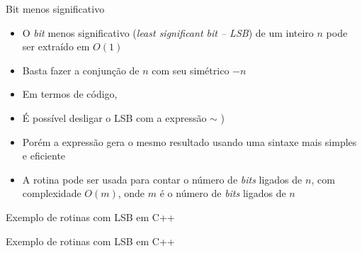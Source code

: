 \begin{frame}[fragile]{Bit menos significativo}

    \begin{itemize}
        \item O \textit{bit} menos significativo (\textit{least significant bit -- LSB}) de um 
            inteiro $n$ pode ser extraído em $O(1)$

        \item Basta fazer a conjunção de $n$ com seu simétrico $-n$

        \item Em termos de código, 

        \item É possível desligar o LSB com a expressão  $\sim$ )

        \item Porém a expressão  gera o mesmo resultado usando uma
            sintaxe mais simples e eficiente

        \item A rotina  pode ser usada para contar o número de \textit{bits} 
            ligados de $n$, com complexidade $O(m)$, onde $m$ é o número de \textit{bits} ligados
            de $n$

    \end{itemize}

\end{frame}

\begin{frame}[fragile]{Exemplo de rotinas com LSB em C++}
\end{frame}

\begin{frame}[fragile]{Exemplo de rotinas com LSB em C++}
\end{frame}

